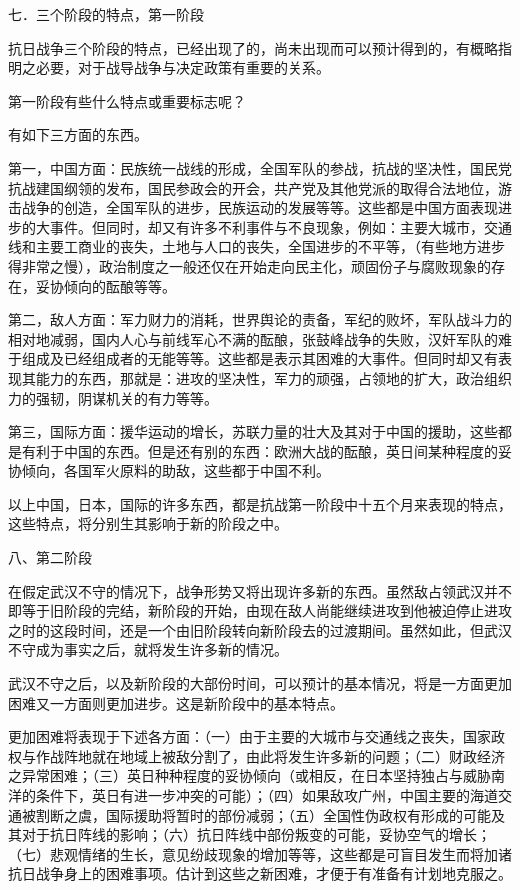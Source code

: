 七．三个阶段的特点，第一阶段

抗日战争三个阶段的特点，已经出现了的，尚未出现而可以预计得到的，有概略指明之必要，对于战导战争与决定政策有重要的关系。

第一阶段有些什么特点或重要标志呢？

有如下三方面的东西。

第一，中国方面：民族统一战线的形成，全国军队的参战，抗战的坚决性，国民党抗战建国纲领的发布，国民参政会的开会，共产党及其他党派的取得合法地位，游击战争的创造，全国军队的进步，民族运动的发展等等。这些都是中国方面表现进步的大事件。但同时，却又有许多不利事件与不良现象，例如：主要大城市，交通线和主要工商业的丧失，土地与人口的丧失，全国进步的不平等，（有些地方进步得非常之慢），政治制度之一般还仅在开始走向民主化，顽固份子与腐败现象的存在，妥协倾向的酝酿等等。

第二，敌人方面：军力财力的消耗，世界舆论的责备，军纪的败坏，军队战斗力的相对地减弱，国内人心与前线军心不满的酝酿，张鼓峰战争的失败，汉奸军队的难于组成及已经组成者的无能等等。这些都是表示其困难的大事件。但同时却又有表现其能力的东西，那就是：进攻的坚决性，军力的顽强，占领地的扩大，政治组织力的强韧，阴谋机关的有力等等。

第三，国际方面：援华运动的增长，苏联力量的壮大及其对于中国的援助，这些都是有利于中国的东西。但是还有别的东西：欧洲大战的酝酿，英日间某种程度的妥协倾向，各国军火原料的助敌，这些都于中国不利。

以上中国，日本，国际的许多东西，都是抗战第一阶段中十五个月来表现的特点，这些特点，将分别生其影响于新的阶段之中。

八、第二阶段

在假定武汉不守的情况下，战争形势又将出现许多新的东西。虽然敌占领武汉并不即等于旧阶段的完结，新阶段的开始，由现在敌人尚能继续进攻到他被迫停止进攻之时的这段时间，还是一个由旧阶段转向新阶段去的过渡期间。虽然如此，但武汉不守成为事实之后，就将发生许多新的情况。

武汉不守之后，以及新阶段的大部份时间，可以预计的基本情况，将是一方面更加困难又一方面则更加进步。这是新阶段中的基本特点。

更加困难将表现于下述各方面：（一）由于主要的大城市与交通线之丧失，国家政权与作战阵地就在地域上被敌分割了，由此将发生许多新的问题；（二）财政经济之异常困难；（三）英日种种程度的妥协倾向（或相反，在日本坚持独占与威胁南洋的条件下，英日有进一步冲突的可能）；（四）如果敌攻广州，中国主要的海道交通被割断之虞，国际援助将暂时的部份减弱；（五）全国性伪政权有形成的可能及其对于抗日阵线的影响；（六）抗日阵线中部份叛变的可能，妥协空气的增长；（七）悲观情绪的生长，意见纷歧现象的增加等等，这些都是可盲目发生而将加诸抗日战争身上的困难事项。估计到这些之新困难，才便于有准备有计划地克服之。

